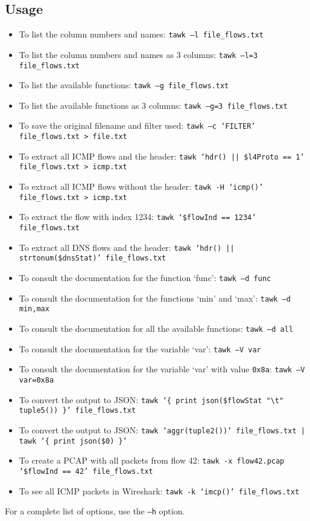 \documentclass[documentation]{subfiles}
\begin{document}
\subsection{Usage}
\begin{itemize}
    \item To list the column numbers and names: {\tt tawk --l file\_flows.txt}
    \item To list the column numbers and names as 3 columns: {\tt tawk --l=3 file\_flows.txt}
    \item To list the available functions: {\tt tawk --g file\_flows.txt}
    \item To list the available functions as 3 columns: {\tt tawk --g=3 file\_flows.txt}
    \item To save the original filename and filter used: {\tt tawk --c `FILTER' file\_flows.txt > file.txt}
    \item To extract all ICMP flows and the header: {\tt tawk `hdr() || \$l4Proto == 1' file\_flows.txt > icmp.txt}
    \item To extract all ICMP flows without the header: {\tt tawk -H `icmp()' file\_flows.txt > icmp.txt}
    \item To extract the flow with index 1234: {\tt tawk `\$flowInd == 1234' file\_flows.txt}
    \item To extract all DNS flows and the header: {\tt tawk `hdr() || strtonum(\$dnsStat)' file\_flows.txt}
    \item To consult the documentation for the function `func': {\tt tawk --d func}
    \item To consult the documentation for the functions `min' and `max': {\tt tawk --d min,max}
    \item To consult the documentation for all the available functions: {\tt tawk --d all}
    \item To consult the documentation for the variable `var': {\tt tawk --V var}
    \item To consult the documentation for the variable `var' with value {\tt 0x8a}: {\tt tawk --V var=0x8a}
    \item To convert the output to JSON: {\tt tawk `\{ print json(\$flowStat "\textbackslash{}t" tuple5()) \}' file\_flows.txt}
    \item To convert the output to JSON: {\tt tawk `aggr(tuple2())' file\_flows.txt | tawk `\{ print json(\$0) \}'}
    \item To create a PCAP with all packets from flow 42: {\tt tawk -x flow42.pcap `\$flowInd == 42' file\_flows.txt}
    \item To see all ICMP packets in Wireshark: {\tt tawk -k `imcp()' file\_flows.txt}
\end{itemize}
For a complete list of options, use the {\tt --h} option.\\
\end{document}
